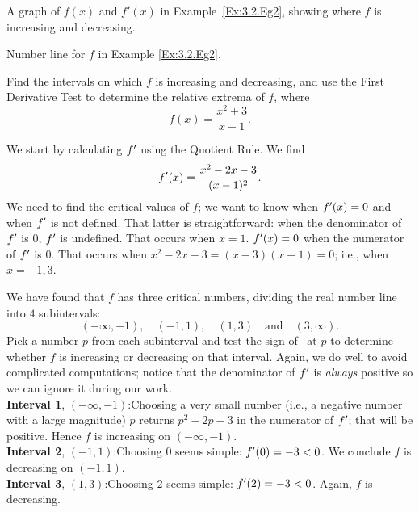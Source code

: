 \begin{marginfigure}[4cm]
\caption{A graph of $f(x)$ and $f'(x)$ in Example~\ref{Ex:3.2.Eg2}, showing where $f$ is increasing and decreasing.} \label{fig:eg3.2.graph}
\end{marginfigure}

\begin{marginfigure}[4cm]
\caption{Number line for $f$ in Example \ref{Ex:3.2.Eg2}.}
\label{F:3.2.signchart}
\end{marginfigure}

\begin{example} \label{Ex:3.2.Eg2}
Find the intervals on which $f$ is increasing and decreasing, and use the First Derivative Test to determine the relative extrema of $f$, where 
$$f(x) = \frac{x^2+3}{x-1}.$$

\solution We start by calculating $f'$ using the Quotient Rule. We find
$$f'(x) = \frac{x^2-2x-3}{(x-1)^2}.$$
We need to find the critical values of $f$; we want to know when $f'(x)=0$ and when $f'$ is not defined. That latter is straightforward: when the denominator of $f'$ is $0$, $f'$ is undefined. That occurs when $x=1$. $f'(x)=0$ when the numerator of $f'$ is $0$. That occurs when $x^2-2x-3 = (x-3)(x+1) = 0$; i.e., when $x=-1,3$. 

We have found that $f$ has three critical numbers, dividing the real number line into $4$ subintervals: $$(-\infty,-1), \quad (-1, 1), \quad (1,3) \quad \text{and} \quad (3,\infty).$$ Pick a number $p$ from each subinterval and test the sign of \fp\ at $p$ to determine whether $f$ is increasing or decreasing on that interval. Again, we do well to avoid complicated computations; notice that the denominator of $f'$ is \textit{always} positive so we can ignore it during our work.\\

\noindent\textbf{Interval 1}, $(-\infty,-1)$:\quad  Choosing a very small number (i.e., a negative number with a large magnitude) $p$ returns $p^2-2p-3$ in the numerator of $f'$; that will be positive. Hence $f$ is increasing on $(-\infty,-1)$.\\

\noindent\textbf{Interval 2}, $(-1,1)$:\quad Choosing $0$ seems simple: $f'(0)=-3<0$. We conclude $f$ is decreasing on $(-1,1)$.\\

\noindent\textbf{Interval 3}, $(1,3)$:\quad Choosing $2$ seems simple: $f'(2) = -3<0$. Again, $f$ is decreasing.\\


\end{example}
